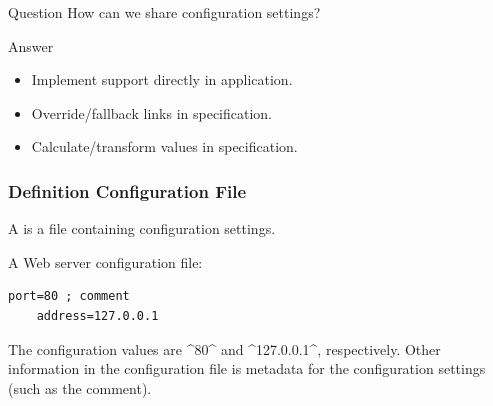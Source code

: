 \begin{frame}
	\begin{alertblock}{Question}
	How can we share configuration settings?
	\end{alertblock}

	\pause
	\begin{exampleblock}{Answer}
	\begin{itemize}
	\item Implement support directly in application.
	\item Override/fallback links in specification.
	\item Calculate/transform values in specification.
	\end{itemize}
	\end{exampleblock}
\end{frame}

\begin{frame}[fragile]
	\frametitle{Definition Configuration File}

	\pause

	A  is a file containing configuration settings.

	A Web server configuration file:

	\begin{lstlisting}[gobble=4]
	port=80 ; comment
	address=127.0.0.1\end{lstlisting}

	\pause

	The configuration values are ^80^ and ^127.0.0.1^, respectively.
	Other information in the configuration file is metadata for the configuration settings (such as the comment).
\end{frame}

